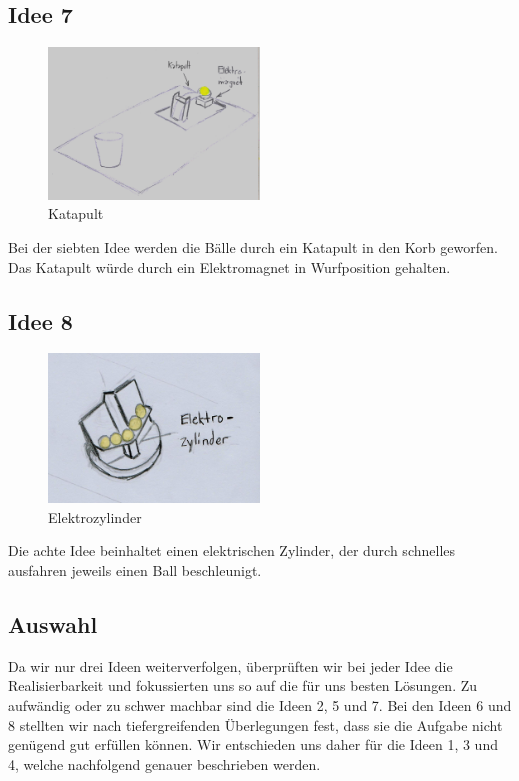 \subsection{Idee 7}
\begin{figure}[h!]
	\centering
	\includegraphics[width=0.5\textwidth]{../../fig/EM-Katapult.jpg}
	\caption{Katapult}
	\label{fig:katapult}
\end{figure}
Bei der siebten Idee werden die Bälle durch ein Katapult in den Korb geworfen. Das Katapult würde durch ein Elektromagnet in Wurfposition gehalten.

\subsection{Idee 8}
\begin{figure}[h!]
	\centering
	\includegraphics[width=0.5\textwidth]{../../fig/Elektrozylindergeraet.jpg}
	\caption{Elektrozylinder}
	\label{fig:elektrozylinder}
\end{figure}
Die achte Idee beinhaltet einen elektrischen Zylinder, der durch schnelles ausfahren jeweils einen Ball beschleunigt.

\subsection{Auswahl}
Da wir nur drei Ideen weiterverfolgen, überprüften wir bei jeder Idee die Realisierbarkeit und fokussierten uns so auf die für uns besten Lösungen.
Zu aufwändig oder zu schwer machbar sind die Ideen 2, 5 und 7. Bei den Ideen 6 und 8 stellten wir nach tiefergreifenden Überlegungen fest, dass sie die Aufgabe nicht genügend gut erfüllen können.
Wir entschieden uns daher für die Ideen 1, 3 und 4, welche nachfolgend genauer beschrieben werden.